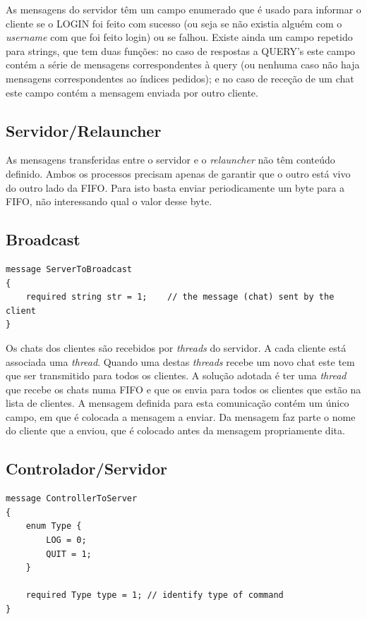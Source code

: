 \documentclass[a4paper]{article}
\begin{document}
	As mensagens do servidor têm um campo enumerado que é usado para informar o cliente se o LOGIN foi feito com sucesso (ou seja se não existia alguém com o \textit{username} com que foi feito login) ou se falhou. Existe ainda um campo repetido para strings, que tem duas funções: no caso de respostas a QUERY's este campo contém a série de mensagens correspondentes à query (ou nenhuma caso não haja mensagens correspondentes ao índices pedidos); e no caso de receção de um chat este campo contém a mensagem enviada por outro cliente. 

	\subsection{Servidor/Relauncher}  

	As mensagens transferidas entre o servidor e o \textit{relauncher} não têm conteúdo definido. Ambos os processos precisam apenas de garantir que o outro está vivo do outro lado da FIFO. Para isto basta enviar periodicamente um byte para a FIFO, não interessando qual o valor desse byte. 

	\subsection{Broadcast} 

	\begin{verbatim}
message ServerToBroadcast 
{ 
    required string str = 1;    // the message (chat) sent by the client 
}
	\end{verbatim} 

	Os chats dos clientes são recebidos por \textit{threads} do servidor. A cada cliente está associada uma \textit{thread}. Quando uma destas \textit{threads} recebe um novo chat este tem que ser transmitido para todos os clientes. A solução adotada é ter uma \textit{thread} que recebe os chats numa FIFO e que os envia para todos os clientes que estão na lista de clientes. A mensagem definida para esta comunicação contém um único campo, em que é colocada a mensagem a enviar. Da mensagem faz parte o nome do cliente que a enviou, que é colocado antes da mensagem propriamente dita. 

	\subsection{Controlador/Servidor}

	\begin{verbatim}
message ControllerToServer 
{ 
    enum Type { 
        LOG = 0; 
        QUIT = 1; 
    } 
 
    required Type type = 1; // identify type of command 
}
	\end{verbatim}
\end{document}
